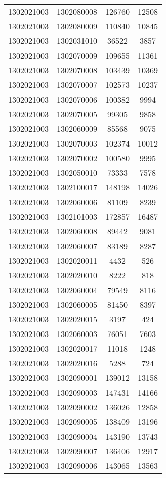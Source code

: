 \begin{longtable}{llcc}
1302021003 & 1302080008 & 126760 & 12508\\
1302021003 & 1302080009 & 110840 & 10845\\
1302021003 & 1302031010 & 36522 & 3857\\
1302021003 & 1302070009 & 109655 & 11361\\
1302021003 & 1302070008 & 103439 & 10369\\
1302021003 & 1302070007 & 102573 & 10237\\
1302021003 & 1302070006 & 100382 & 9994\\
1302021003 & 1302070005 & 99305 & 9858\\
1302021003 & 1302060009 & 85568 & 9075\\
1302021003 & 1302070003 & 102374 & 10012\\
1302021003 & 1302070002 & 100580 & 9995\\
1302021003 & 1302050010 & 73333 & 7578\\
1302021003 & 1302100017 & 148198 & 14026\\
1302021003 & 1302060006 & 81109 & 8239\\
1302021003 & 1302101003 & 172857 & 16487\\
1302021003 & 1302060008 & 89442 & 9081\\
1302021003 & 1302060007 & 83189 & 8287\\
1302021003 & 1302020011 & 4432 & 526\\
1302021003 & 1302020010 & 8222 & 818\\
1302021003 & 1302060004 & 79549 & 8116\\
1302021003 & 1302060005 & 81450 & 8397\\
1302021003 & 1302020015 & 3197 & 424\\
1302021003 & 1302060003 & 76051 & 7603\\
1302021003 & 1302020017 & 11018 & 1248\\
1302021003 & 1302020016 & 5288 & 724\\
1302021003 & 1302090001 & 139012 & 13158\\
1302021003 & 1302090003 & 147431 & 14166\\
1302021003 & 1302090002 & 136026 & 12858\\
1302021003 & 1302090005 & 138409 & 13196\\
1302021003 & 1302090004 & 143190 & 13743\\
1302021003 & 1302090007 & 136406 & 12917\\
1302021003 & 1302090006 & 143065 & 13563\\

\end{longtable}
